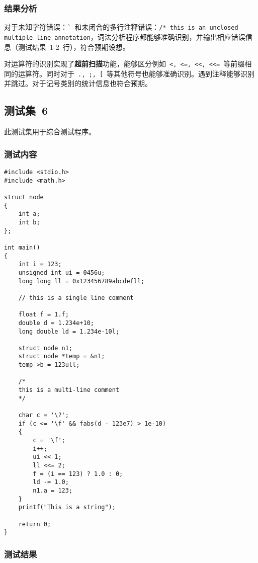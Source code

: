 \documentclass[lang=cn,11pt,a4paper]{paper}
\begin{document}
\subsubsection{结果分析}

对于未知字符错误：\lstinline{`}\ 和未闭合的多行注释错误：\lstinline{/* this is an unclosed multiple line annotation}，词法分析程序都能够准确识别，并输出相应错误信息（测试结果\ 1-2\ 行），符合预期设想。

对运算符的识别实现了\textbf{超前扫描}功能，能够区分例如\ \lstinline{<, <=, <<, <<=}\ 等前缀相同的运算符。同时对于\ \lstinline{., ;, [}\ 等其他符号也能够准确识别。遇到注释能够识别并跳过。对于记号类别的统计信息也符合预期。

\subsection{测试集\ 6}

此测试集用于综合测试程序。

\subsubsection{测试内容}

\begin{lstlisting}
#include <stdio.h>
#include <math.h>

struct node
{
    int a;
    int b;
};

int main()
{
    int i = 123;
    unsigned int ui = 0456u;
    long long ll = 0x123456789abcdefll;

    // this is a single line comment

    float f = 1.f;
    double d = 1.234e+10;
    long double ld = 1.234e-10l;

    struct node n1;
    struct node *temp = &n1;
    temp->b = 123ull;

    /*
    this is a multi-line comment
    */

    char c = '\?';
    if (c <= '\f' && fabs(d - 123e7) > 1e-10)
    {
        c = '\f';
        i++;
        ui << 1;
        ll <<= 2;
        f = (i == 123) ? 1.0 : 0;
        ld -= 1.0;
        n1.a = 123;
    }
    printf("This is a string");
    
    return 0;
}
\end{lstlisting}

\subsubsection{测试结果}
\end{document}
